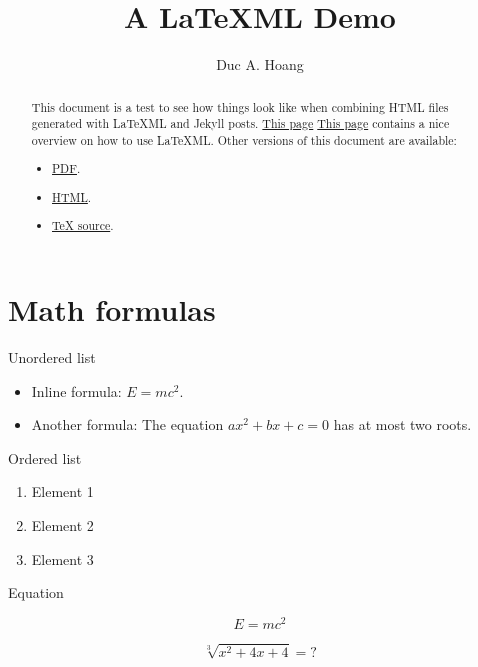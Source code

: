 \documentclass[a4paper]{article}
\title{}
\author{}
\title{A LaTeXML Demo}
\author{Duc A. Hoang}
\theoremstyle{definition}
\theoremstyle{remark}
\numberwithin{equation}{section}
\begin{document}
\nocite{*}


\maketitle

\begin{abstract}
This document is a test to see how things look like when combining HTML files generated with LaTeXML and Jekyll posts.
\iflatexml 
\href{https://hackmd.io/%40UoL-IWG/latexml}{This page} 
\else 
\href{https://hackmd.io/\%40UoL-IWG/latexml}{This page} 
\fi 
contains a nice overview on how to use LaTeXML.
Other versions of this document are available:
\begin{itemize}
	\iflatexml
	\item \href{https://hoanganhduc.github.io/misc/a-latexml-demo/main.pdf}{PDF}.
	\else
	\item \href{https://hoanganhduc.github.io/misc/a-latexml-demo/}{HTML}.
	\fi
	\item \href{https://hoanganhduc.github.io/misc/a-latexml-demo/main.zip}{TeX source}.
\end{itemize}
\end{abstract}

\tableofcontents

\section{Math formulas}

Unordered list

\begin{itemize}
\item Inline formula: $E = mc^2$.
\item Another formula: The equation $ax^2 + bx + c = 0$ has at most two roots.
\end{itemize}

Ordered list

\begin{enumerate}
\item Element 1
\item Element 2
\item Element 3
\end{enumerate}

Equation

\begin{equation}
E = mc^2
\end{equation}

\[
	\sqrt[3]{x^2 + 4x + 4} = ?
\]
\end{document}
